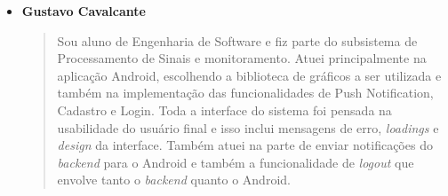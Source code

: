 \begin{itemize}
    \item \textbf{Gustavo Cavalcante}
    \begin{quote}
    Sou aluno de Engenharia de Software e fiz parte do subsistema de Processamento de Sinais
    e monitoramento. Atuei principalmente na aplicação Android, escolhendo a
    biblioteca de gráficos a ser utilizada e também na implementação das funcionalidades de
    Push Notification, Cadastro e Login. Toda a interface do sistema foi pensada na
    usabilidade do usuário final e isso inclui mensagens de erro, \textit{loadings} e
    \textit{design} da interface. Também atuei na parte de enviar notificações do 
    \textit{backend} para o Android e também a funcionalidade de \textit{logout} que envolve
    tanto o \textit{backend} quanto o Android.

    \end{quote}
\end{itemize}
